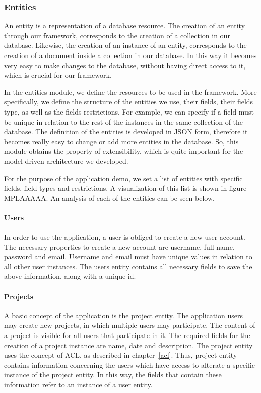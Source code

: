 \subsubsection{Entities}
\label{entities}
An entity is a representation of a database resource. The creation of an entity through our framework, corresponds to the creation of a collection in our database. Likewise, the creation of an instance of an entity, corresponds to the creation of a document inside a collection in our database. In this way it becomes very easy to make changes to the database, without having direct access to it, which is crucial for our framework.\par
	In the entities module, we define the resources to be used in the framework. More specifically, we define the structure of the entities we use, their fields, their fields type, as well as the fields restrictions. For example, we can specify if a field must be unique in relation to the rest of the instances in the same collection of the database. The definition of the entities is developed in JSON form, therefore it becomes really easy to change or add more entities in the database. So, this module obtains the property of extensibility, which is quite important for the model-driven architecture we developed. \par 
	For the purpose of the application demo, we set a list of entities with specific fields, field types and restrictions. A visualization of this list is shown in figure MPLAAAAA. An analysis of each of the entities can be seen below.\par
	
	 
\paragraph{Users}
In order to use the application, a user is obliged to create a new user account. The necessary properties to create a new account are username, full name, password and email. Username and email must have unique values in relation to all other user instances. The users entity  contains all necessary fields to save the above information, along with a unique id.
\paragraph{Projects}
A basic concept of the application is the project entity. The application users may create new projects, in which multiple users may participate. The content of a project is visible for all users that participate in it. The required fields for the creation of a project instance are name, date and description. The project entity uses the concept of ACL, as described in chapter~\ref{acl}. Thus, project entity contains information concerning the users which have access to alterate a specific instance of the project entity. In this way, the fields that contain these information refer to an instance of a user entity.
